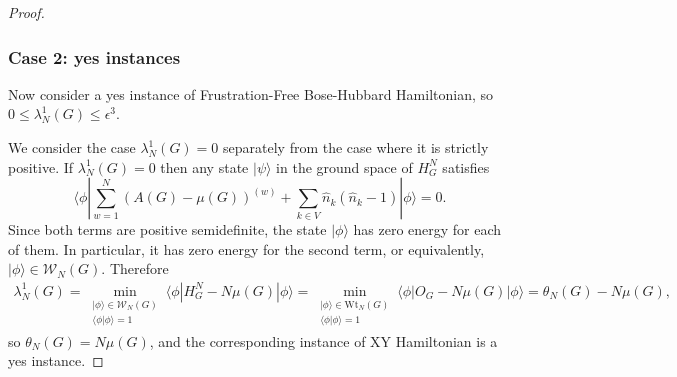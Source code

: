 \documentclass[../thesis-main/thesis-main]{subfiles}
\begin{document}
\begin{proof}
\subsubsection*{Case 2: yes instances}

Now consider a yes instance of Frustration-Free Bose-Hubbard Hamiltonian,  so $0\leq \lambda_N^1 (G)\leq \epsilon^3$. 

We consider the case $\lambda_N^1 (G)=0$ separately from the case where it is strictly positive. If $\lambda_N^1 (G)=0$ then any state $|\psi\rangle$ in the ground space of $H_G^N$ satisfies 
\[
\langle \phi|\sum_{w=1}^N \left(A(G)-\mu(G)\right)^{(w)}+\sum_{k\in V} \widehat{n}_k(\widehat{n}_k-1)|\phi\rangle=0.
\]
Since both terms are positive semidefinite, the state $|\phi\rangle$ has zero energy for each of them. In particular, it has zero energy for the second term, or equivalently, $|\phi\rangle\in \mathcal{W}_N(G)$. Therefore
\begin{align*}
\lambda_N^1 (G) = \min_{\substack{|\phi\rangle\in \mathcal{W}_N(G)\\ \langle \phi|\phi\rangle=1}} \langle \phi| H_G^N-N\mu(G)|\phi\rangle =\min_{\substack{|\phi\rangle\in \mathrm{Wt}_N(G)\\ \langle \phi|\phi\rangle=1}} \langle \phi| O_G-N\mu(G)|\phi\rangle= \theta_N(G)-N\mu(G),
\end{align*}
so $\theta_N(G)= N\mu(G)$, and the corresponding instance of XY Hamiltonian is a yes instance.


\end{proof}
\end{document}
